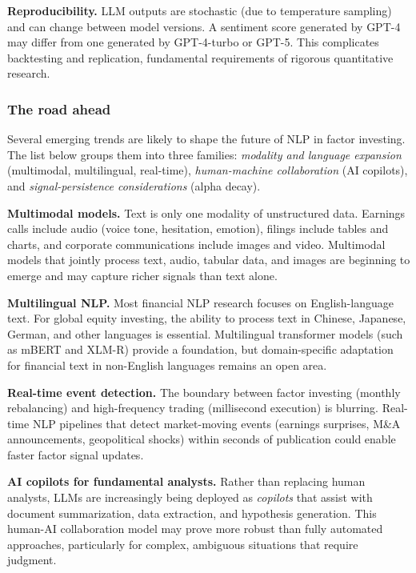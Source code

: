 \textbf{Reproducibility.} LLM outputs are stochastic (due to temperature sampling) and can change between model versions. A sentiment score generated by GPT-4 may differ from one generated by GPT-4-turbo or GPT-5. This complicates backtesting and replication, fundamental requirements of rigorous quantitative research.

\subsubsection{The road ahead}

Several emerging trends are likely to shape the future of NLP in factor investing. The list below groups them into three families: \textit{modality and language expansion} (multimodal, multilingual, real-time), \textit{human-machine collaboration} (AI copilots), and \textit{signal-persistence considerations} (alpha decay).

\textbf{Multimodal models.} Text is only one modality of unstructured data. Earnings calls include audio (voice tone, hesitation, emotion), filings include tables and charts, and corporate communications include images and video. Multimodal models that jointly process text, audio, tabular data, and images are beginning to emerge and may capture richer signals than text alone.

\textbf{Multilingual NLP.} Most financial NLP research focuses on English-language text. For global equity investing, the ability to process text in Chinese, Japanese, German, and other languages is essential. Multilingual transformer models (such as mBERT and XLM-R) provide a foundation, but domain-specific adaptation for financial text in non-English languages remains an open area.

\textbf{Real-time event detection.} The boundary between factor investing (monthly rebalancing) and high-frequency trading (millisecond execution) is blurring. Real-time NLP pipelines that detect market-moving events (earnings surprises, M\&A announcements, geopolitical shocks) within seconds of publication could enable faster factor signal updates.

\textbf{AI copilots for fundamental analysts.} Rather than replacing human analysts, LLMs are increasingly being deployed as \textit{copilots} that assist with document summarization, data extraction, and hypothesis generation. This human-AI collaboration model may prove more robust than fully automated approaches, particularly for complex, ambiguous situations that require judgment.

